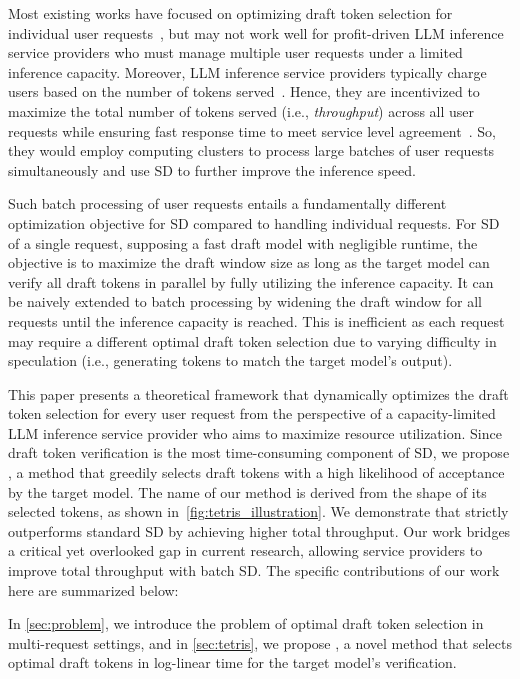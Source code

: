 Most existing works have focused on optimizing draft token selection for individual user requests~\citep{agrawal2024adaedlearlydraftstopping,huang2024specdecboostingspeculativedecoding,liu2024parallelspeculativedecodingadaptive,mamou2024dynamicspeculation}, but may not work well for profit-driven LLM inference service providers who must manage multiple user requests under a limited inference capacity.
Moreover, LLM inference service providers typically charge users based on the number of tokens served~\citep{fireworksai,replicate}. 
Hence, they are incentivized to maximize the total number of tokens served (i.e., {\em throughput}) across all user requests while ensuring fast response time to meet service level agreement~\citep{wieder2011service}.
So, they would employ computing clusters to process large batches of user requests simultaneously and use SD to further improve the inference speed.


Such batch processing of user requests entails a fundamentally different optimization objective for SD compared to handling individual requests.
For SD of a single request, supposing a fast draft model with negligible runtime, the objective is to maximize the draft window size as long as the target model can verify all draft tokens in parallel by fully utilizing the inference capacity.
It can be naively extended to batch processing by widening the draft window for all requests until the inference capacity is reached.
This is inefficient as each request may require a different optimal draft token selection due to varying difficulty in speculation (i.e., generating tokens to match the target model's output).


This paper presents a theoretical framework that dynamically optimizes the draft token selection for every user request from the perspective of a capacity-limited LLM inference service provider who aims to maximize resource utilization. 
Since draft token verification is the most time-consuming component of SD, we propose \textbf{\alg}, a method that greedily selects draft tokens with a high likelihood of acceptance by the target model. The name of our method is derived from the shape of its selected tokens, as shown in~\cref{fig:tetris_illustration}.
We demonstrate that \alg{} strictly outperforms standard SD by achieving higher total throughput.
Our work bridges a critical yet overlooked gap in current research, allowing service providers to improve total throughput with batch SD. 
The specific contributions of our work here are summarized below:
\squishlisttwo
    \item In \cref{sec:problem}, we introduce the problem of optimal draft token selection in multi-request settings, and in \cref{sec:tetris}, we propose \alg{}, a novel method that selects optimal draft tokens in log-linear time for the target model's verification. 

